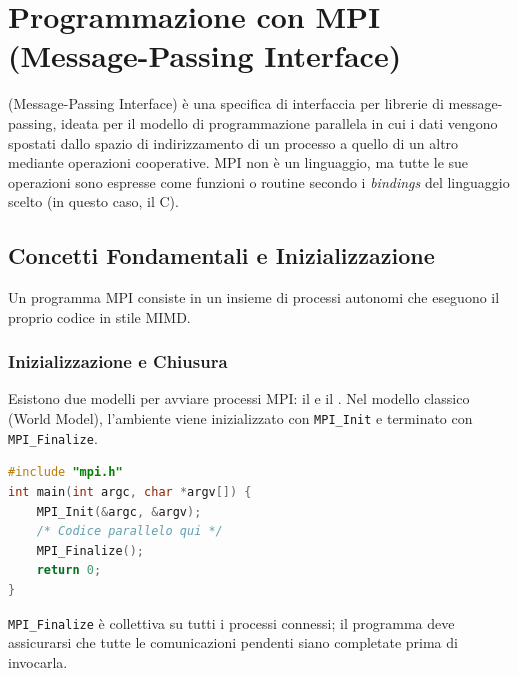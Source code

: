 \chapter{Programmazione con MPI (Message-Passing Interface)} 

 (Message-Passing Interface) è una specifica di interfaccia per librerie di message-passing, ideata per il modello di programmazione parallela in cui i dati vengono spostati dallo spazio di indirizzamento di un processo a quello di un altro mediante operazioni cooperative. MPI non è un linguaggio, ma tutte le sue operazioni sono espresse come funzioni o routine secondo i \textit{bindings} del linguaggio scelto (in questo caso, il C).

\section{Concetti Fondamentali e Inizializzazione}
Un programma MPI consiste in un insieme di processi autonomi che eseguono il proprio codice in stile MIMD.

\subsection{Inizializzazione e Chiusura}
Esistono due modelli per avviare processi MPI: il  e il . Nel modello classico (World Model), l'ambiente viene inizializzato con \texttt{MPI\_Init} e terminato con \texttt{MPI\_Finalize}.
\begin{lstlisting}[language=C, numbers=none]
#include "mpi.h"
int main(int argc, char *argv[]) {
    MPI_Init(&argc, &argv);
    /* Codice parallelo qui */
    MPI_Finalize();
    return 0;
}
\end{lstlisting}
\begin{note}{}
    \texttt{MPI\_Finalize} è collettiva su tutti i processi connessi; il programma deve assicurarsi che tutte le comunicazioni pendenti siano completate prima di invocarla.
\end{note}

